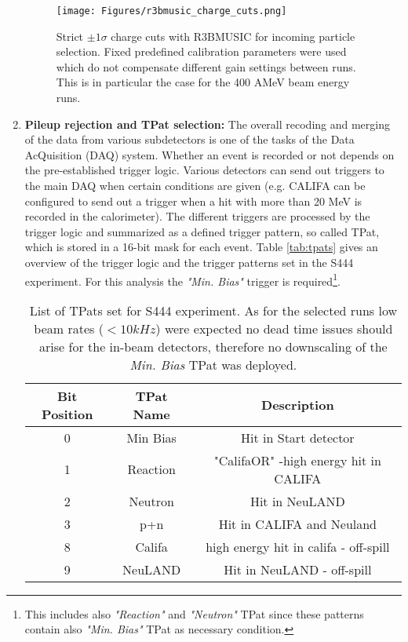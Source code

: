 \begin{enumerate}
\begin{figure}
\centering
\texttt{[image: Figures/r3bmusic\_charge\_cuts.png]}
\caption{Strict $\pm 1 \sigma$ charge cuts with R3BMUSIC for incoming particle selection. Fixed predefined calibration parameters were used which do not compensate different gain settings between runs. This is in particular the case for the 400 AMeV beam energy runs.}
\label{fig:r3bmusic_cuts}
\end{figure}
\item \textbf{Pileup rejection and TPat selection:}\newline
The overall recoding and merging of the data from various subdetectors is one of the tasks of the Data AcQuisition (DAQ) system. Whether an event is recorded or not depends on the pre-established trigger logic. Various detectors can send out triggers to the main DAQ when certain conditions are given (e.g. CALIFA can be configured to send out a trigger when a hit with more than 20 MeV is recorded in the calorimeter). The different triggers are processed by the trigger logic and summarized as a defined trigger pattern, so called TPat, which is stored in a 16-bit mask for each event. Table \ref{tab:tpats} gives an overview of the trigger logic and the trigger patterns set in the S444 experiment. For this analysis the \textit{"Min. Bias"} trigger is required\footnote{This includes also \textit{"Reaction"} and \textit{"Neutron"} TPat since these patterns contain also \textit{"Min. Bias"} TPat as necessary condition.}.\newline 
\begin{table}[h!]
\centering
\begin{tabular}{||c c c||} 
\hline
Bit Position &TPat Name & Description \\
\hline\hline
0 & Min Bias & Hit in Start detector\\
1 & Reaction & "CalifaOR" -high energy hit in CALIFA \\
2 & Neutron & Hit in NeuLAND \\
3 & p+n & Hit in CALIFA and Neuland \\
8 & Califa & high energy hit in califa - off-spill \\
9 & NeuLAND & Hit in NeuLAND - off-spill \\
\hline\hline
\end{tabular}
\caption{List of TPats set for S444 experiment. As for the selected runs low beam rates ($< 10kHz$) were expected no dead time issues should arise for the in-beam detectors, therefore no downscaling of the \textit{Min. Bias} TPat was deployed.}

\end{table}
\end{enumerate}
